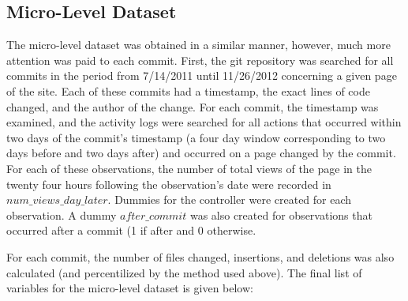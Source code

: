 \documentclass[12pt]{article}
\begin{document}
\subsection{Micro-Level Dataset}

The micro-level dataset was obtained in a similar manner, however, much more attention was paid to each commit. First, the git repository was searched for all commits in the period from 7/14/2011 until 11/26/2012 concerning a given page of the site. Each of these commits had a timestamp, the exact lines of code changed, and the author of the change. For each commit, the timestamp was examined, and the activity logs were searched for all actions that occurred within two days of the commit's timestamp (a four day window corresponding to two days before and two days after) and occurred on a page changed by the commit. For each of these observations, the number of total views of the page in the twenty four hours following the observation's date were recorded in $num\_views\_day\_later$. Dummies for the controller were created for each observation. A dummy $after\_commit$ was also created for observations that occurred after a commit (1 if after and 0 otherwise. 

For each commit, the number of files changed, insertions, and deletions was also calculated (and percentilized by the method used above). The final list of variables for the micro-level dataset is given below:
\end{document}
